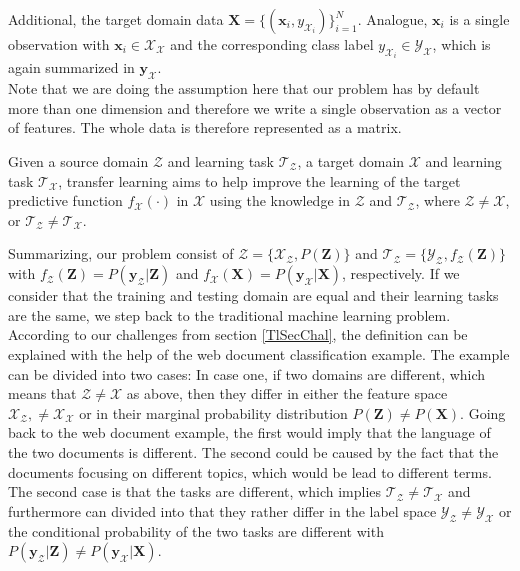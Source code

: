 Additional, the target domain data $\mathbf{X} = \{(\mathbf{x}_i,y_{\mathcal{X}_i})\}_{i=1}^{N}$.
Analogue, $\mathbf{x}_i$ is a single observation with $\mathbf{x}_i \in \mathcal{X}_\mathcal{X}$ and the corresponding class label $y_{\mathcal{X}_i} \in \mathcal{Y}_\mathcal{X}$, which is again summarized in $\mathbf{y}_\mathcal{X}$.\cite[p. 2]{Aggarwal.2015}\\
Note that we are doing the assumption here that our problem has by default more than one dimension and therefore we write a single observation as a vector of features.
The whole data is therefore represented as a matrix.
\begin{mDef}\label{DefTl}
	Given a source domain $\mathcal{Z}$ and learning task $\mathcal{T}_\mathcal{Z}$, a target domain $\mathcal{X}$ and learning task $\mathcal{T}_\mathcal{X}$, transfer learning aims to help improve the learning of the target predictive function $f_\mathcal{X}(\cdot)$ in $\mathcal{X}$ using the knowledge in $\mathcal{Z}$ and $\mathcal{T}_\mathcal{Z}$, where $\mathcal{Z} \neq \mathcal{X}$, or $\mathcal{T}_\mathcal{Z} \neq \mathcal{T}_\mathcal{X}$.\cite[p. 542]{Aggarwal.2015}
\end{mDef}
Summarizing, our problem consist of $\mathcal{Z}=\{\mathcal{X}_\mathcal{Z},P(\mathbf{Z})\}$ and $\mathcal{T_Z}=\{\mathcal{Y_Z},f_\mathcal{Z}(\mathbf{Z})\}$ with $f_\mathcal{Z}(\mathbf{Z}) = P(\mathbf{y}_\mathcal{Z}|\mathbf{Z})$ and $f_\mathcal{X}(\mathbf{X}) = P(\mathbf{y}_\mathcal{X}|\mathbf{X})$, respectively. 
If we consider that the training and testing domain are equal and their learning tasks are the same, we step back to the traditional machine learning problem.\\
According to our challenges from section \ref{TlSecChal}, the definition can be explained with the help of the web document classification example.
The example can be divided into two cases:
In case one, if two domains are different, which means that $\mathcal{Z} \neq \mathcal{X}$ as above, then they differ in either the feature space $\mathcal{X_Z}, \neq \mathcal{X_X}$ or in their marginal probability distribution $P(\mathbf{Z}) \neq P(\mathbf{X})$.
Going back to the web document example, the first would imply that the language of the two documents is different.
The second could be caused by the fact that the documents focusing on different topics, which would be lead to different terms.\cite{Pan.2010}\\
The second case is that the tasks are different, which implies $\mathcal{T_Z} \neq \mathcal{T_X}$ and furthermore can divided into that they rather differ in the label space $\mathcal{Y_Z} \neq \mathcal{Y_X}$ or the conditional probability of the two tasks are different with $P(\mathbf{y}_\mathcal{Z}\vert \mathbf{Z}) \neq P(\mathbf{y}_\mathcal{X}\vert \mathbf{X})$.
